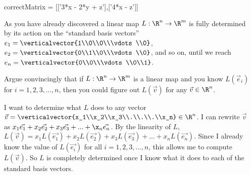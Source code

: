 \documentclass{ximera}
\begin{document}
\begin{question}
\begin{solution}
    \begin{matrix-answer}[name=v]
      correctMatrix = [['3*x - 2*y + z'],['4*x - z']]
    \end{matrix-answer}
    
  \end{solution}

  As you have already discovered a linear map $L: \R^n \to \R^m$ is
  fully determined by its action on the ``standard basis vectors''
  $e_1 = \verticalvector{1\\0\\0\\\vdots\\0}$, $e_2 =
  \verticalvector{0\\1\\0\\\vdots\\0}$, and so on, until we reach $e_n
  = \verticalvector{0\\0\\\vdots\\0\\1}$.

  Argue convincingly that if $L:\R^n \to\R^m$ is a linear map and you know $L(\vec{e}_i)$ for $i=1,2,3,...,n$, then you could figure out $L(\vec{v})$ for
  any $\vec{v} \in \R^n$.
  \begin{free-response}
    I want to determine what $L$ does to any vector $\vec{v} = \verticalvector{x_1\\x_2\\x_3\\.\\.\\.\\x_n} \in \R^n$.  
    I can rewrite $\vec{v}$ as $x_1\vec{e_1}+x_2\vec{e_2}+x_3\vec{e_3}+...+\x_n\vec{e_n}$.  By the linearity of $L$,
    $L(\vec{v}) = x_1L(\vec{e_1})+x_2L(\vec{e_2})+x_3L(\vec{e_3})+...+x_nL(\vec{e_n})$.  Since I already know the value of 
    $L(\vec{e_i})$ for all $i=1,2,3,...,n$, this allows me to compute $L(\vec{v})$.  So $L$ is completely determined once I know what it does to each of the
    standard basis vectors. 
  \end{free-response}
\end{question}
\end{document}
